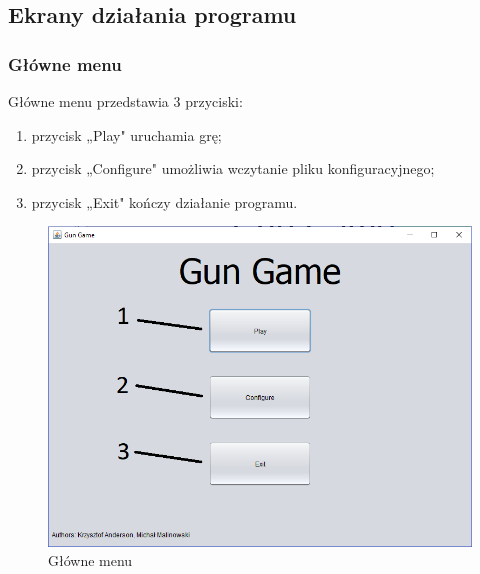 \documentclass[12pt]{report}
\begin{document}
\subsection{Ekrany działania programu}
    \subsubsection{Główne menu}
    Główne menu przedstawia 3 przyciski:
    \begin{enumerate}
        \item przycisk „Play" uruchamia grę;
        \item przycisk „Configure" umożliwia wczytanie pliku konfiguracyjnego;
        \item przycisk „Exit" kończy działanie programu.
    \end{enumerate}
    \begin{figure}[H]
    \centering
    \includegraphics[width=14cm]{Obrazy/mainmenuscreen.png}
    \caption{Główne menu}
    \label{main menu}
    \end{figure}
\end{document}

